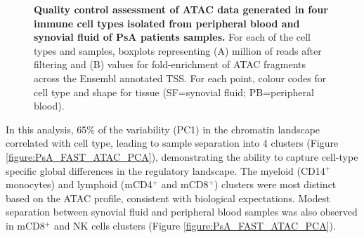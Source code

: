 \begin{figure}[H]
\begin{subfigure}[b]{0.48\textwidth}
\caption{}
\end{subfigure}
\caption[Quality control assessment of ATAC data generated in four immune cell types isolated from peripheral blood and synovial fluid of PsA patients samples.]{\textbf{Quality control assessment of ATAC data generated in four immune cell types isolated from peripheral blood and synovial fluid of PsA patients samples.} For each of the cell types and samples, boxplots representing (A) million of reads after filtering and (B) values for fold-enrichment of ATAC fragments across the Ensembl annotated TSS. For each point, colour codes for cell type and shape for tissue (SF=synovial fluid; PB=peripheral blood).}
\label{figure:PsA_FAST_ATAC_QC}
\end{figure}



In this analysis, 65\% of the variability (PC1) in the chromatin landscape correlated with cell type, leading to sample separation into 4 clusters (Figure \ref{figure:PsA_FAST_ATAC_PCA}), demonstrating the ability to capture cell-type specific global differences in the regulatory landscape. The myeloid (CD14$^+$ monocytes) and lymphoid (mCD4$^+$ and mCD8$^+$) clusters were most distinct based on the ATAC profile, consistent with biological expectations. Modest separation between synovial fluid and peripheral blood samples was also observed in mCD8$^+$ and NK cells clusters (Figure \ref{figure:PsA_FAST_ATAC_PCA}).



